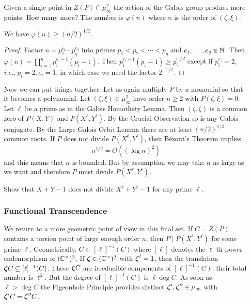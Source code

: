Given a single point in $Z(P)\cap\mu_\infty^2$ the action of the
Galois group producs more points. How many more? The number is
$\varphi(n)$ where $n$ is the order of $(\zeta,\xi)$. 

\begin{lemma}
  We have $\varphi(n) \ge (n/2)^{1/2}$. 
\end{lemma}
\begin{proof}
  Factor $n=p_1^{e_1}\cdots p_g^{e_g}$ into primes $p_1<p_2<\cdots <
  p_g$ and $e_1,\ldots,e_g\in{\mathbb{N}}$. Then $\varphi(n) = \prod_{i=1}^g
  p_i^{e_i-1}(p_i-1)$. Then $p_i^{e_i-1}(p_i-1)\ge p_i^{e_i/2}$ except
  if $p_i^{e_i}=2$, \textit{i.e.}, $p_i=2,e_i=1$, in which case we
  need the factor $2^{-1/2}$. 
\end{proof}

Now we can put things together. Let us again multiply $P$ by a
monomial so that it becomes a polynomial.
Let $(\zeta,\xi)\in \mu_\infty^2$ have order $n\ge 2$ with
$P(\zeta,\xi)=0$. Let $\ell$ be a prime as in the Galois Homothety Lemma.
Then $(\zeta,\xi)$ is a common zero of $P(X,Y)$ and
$P(X^{\ell},Y^{\ell})$. By the Crucial Observation so is any Galois
conjugate. By the Large Galois Orbit Lemma there are at least
$(n/2)^{1/2}$ common roots. If $P$ does not divide $P(X^\ell,Y^\ell)$,
then B\'ezout's Theorem implies
\begin{equation*}
  n^{1/2} = O((\log n)^2)
\end{equation*}
and this means that $n$ is bounded. But by assumption we may take $n$
as large as we want and therefore $P$ must divide $P(X^\ell,Y^\ell)$.

\begin{exercise}
  Show that $X+Y-1$ does not divide  $X^\ell + Y^\ell-1$ for any prime
  $\ell$. 
\end{exercise}

\subsubsection{Functional Transcendence}

We return to a more geometric point of view in this final set.
If $C=Z(P)$ contains a torsion point of large enough order $n$, then
$P \mid P(X^\ell,Y^\ell)$ for some prime $\ell$.
Geometrically, $C \subset [\ell]^{-1}(C)$ where $[\ell]$ denotes the $\ell$-th
power endomorphism of $({\mathbb{C}}^\times)^2$.
If ${\boldsymbol{\zeta}}\in ({\mathbb{C}}^\times)^2$ with ${\boldsymbol{\zeta}}^\ell=1$, then the
translation ${\boldsymbol{\zeta}} C\subseteq [\ell]^{-1}(C)$. These ${\boldsymbol{\zeta}} C$ are
irreducible components of $[\ell]^{-1}(C)$; their total number is
$\ell^2$. But the degree of $[\ell]^{-1}(C)$ is $\ell \deg C$. As soon
as $\ell > \deg C$ the Pigeonhole Principle provides distinct
${\boldsymbol{\zeta}}',{\boldsymbol{\zeta}}''\in \mu_\infty$ with ${\boldsymbol{\zeta}}' C = {\boldsymbol{\zeta}}''C$.

